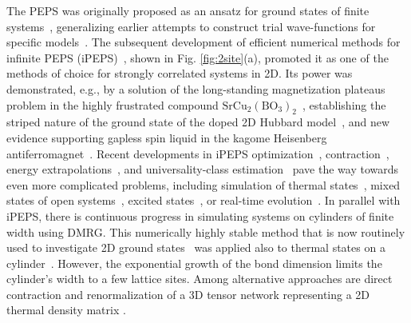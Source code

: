 \documentclass[prb,twocolumn,showkeys,showpacs,amsmath,amsfonts,floatfix,superscriptaddress,nofootinbib]{revtex4-1}
\begin{document}
The PEPS was originally proposed as an ansatz for ground states of finite systems~\cite{Verstraete_PEPS_04, Murg_finitePEPS_07}, generalizing earlier attempts to construct trial wave-functions for specific models~\cite{Nishino_2DvarTN_04}. The subsequent development of efficient numerical methods for infinite PEPS (iPEPS)~\cite{Cirac_iPEPS_08,Xiang_SU_08,Gu_TERG_08,Orus_CTM_09}, shown in Fig. \ref{fig:2site}(a), promoted it as one of the methods of choice for strongly correlated systems in 2D. Its power was demonstrated, e.g., by a solution of the long-standing magnetization plateaus problem in the highly frustrated compound $\textrm{SrCu}_2(\textrm{BO}_3)_2$~\cite{matsuda13,corboz14_shastry}, establishing the striped nature of the ground state of the doped 2D Hubbard model~\cite{Simons_Hubb_17}, and new evidence supporting gapless spin liquid in the kagome Heisenberg antiferromagnet~\cite{Xinag_kagome_17}. Recent developments in iPEPS optimization~\cite{fu,Corboz_varopt_16,Vanderstraeten_varopt_16}, contraction~\cite{Fishman_FPCTM_17,Xie_PEPScontr_17}, energy extrapolations~\cite{Corboz_Eextrap_16}, and universality-class estimation~\cite{Corboz_FCLS_18,Rader_FCLS_18,Rams_xiD_18} pave the way towards even more complicated problems, including simulation of thermal states~\cite{Czarnik_evproj_12,Czarnik_fevproj_14,Czarnik_SCevproj_15, Czarnik_compass_16,Czarnik_VTNR_15,Czarnik_fVTNR_16,Czarnik_eg_17,Dai_fidelity_17,CzarnikDziarmagaCorboz,czarnik19b,Orus_SUfiniteT_18,CzarnikKH,wietek19,jimenez20,poilblanc20,CzarnikSS}, mixed states of open systems~\cite{Kshetrimayum_diss_17,CzarnikDziarmagaCorboz}, excited states~\cite{Vanderstraeten_tangentPEPS_15,ExcitationCorboz}, or real-time evolution~\cite{CzarnikDziarmagaCorboz,HubigCirac,tJholeHubig,Abendschein08,SUlocalization,SUtimecrystal}. In parallel with iPEPS, there is continuous progress in simulating systems on cylinders of finite width using DMRG. This numerically highly stable method that is now routinely used to investigate 2D ground states~\cite{Simons_Hubb_17,CincioVidal} was applied also to thermal states on a cylinder~\cite{Stoudenmire_2DMETTS_17,Weichselbaum_Tdec_18,WeichselbaumTriangular,WeichselbaumBenchmark,chen20}. However, the exponential growth of the bond dimension limits the cylinder's width to a few lattice sites. Among alternative approaches are direct contraction and renormalization of a 3D tensor network representing a 2D thermal density matrix \cite{Li_LTRG_11,Xie_HOSRG_12,Ran_ODTNS_12,Ran_NCD_13,Ran_THAFstar_18,Su_THAFoctakagome_17,Su_THAFkagome_17,Ran_Tembedding_18}.
\end{document}
